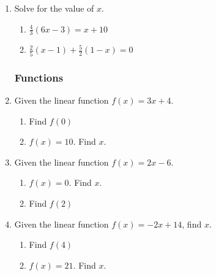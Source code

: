 \begin{enumerate}
  \item Solve for the value of $x$.
  \begin{multicols}{2}
    \begin{enumerate}
      \item   $\frac{4}{3}(6x-3)=x + 10$
      \item   $\frac{2}{5}(x-1)+\frac{5}{2}(1-x)=0$
    \end{enumerate}
  \end{multicols}


\subsubsection*{Functions}
\item Given the linear function $f(x)=3x+4$.
\begin{multicols}{2}
  \begin{enumerate}
    \item Find $f(0)$ %
    \item   $f(x)=10$. Find $x$. %
  \end{enumerate}
\end{multicols}

\item Given the linear function $f(x)=2x-6$.
\begin{multicols}{2}
  \begin{enumerate}
    \item   $f(x)=0$. Find $x$. %
    \item Find $f(2)$ %
  \end{enumerate}
\end{multicols}

\item Given the linear function $f(x)=-2x+14$, find $x$.
\begin{multicols}{2}
  \begin{enumerate}
    \item Find $f(4)$
    \item   $f(x)=21$. Find $x$.
  \end{enumerate}
\end{multicols} %



\end{enumerate}
